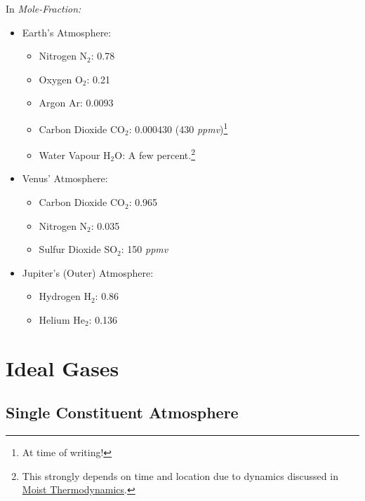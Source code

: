 In \textit{Mole-Fraction:}
\begin{multicols}{2}
\begin{itemize}
    \item Earth's Atmosphere: 
    \begin{itemize}
        \item Nitrogen N$_2$: 0.78
        \item Oxygen O$_2$: 0.21
        \item Argon Ar: 0.0093
        \item Carbon Dioxide CO$_2$: 0.000430 (430 \textit{ppmv})\footnote{At time of writing!}
        \item Water Vapour H$_2$O: A few percent.\footnote{This strongly depends on time and location due to dynamics discussed in \hyperref[Moist Thermodynamics]{Moist Thermodynamics}.}
    \end{itemize}
\end{itemize}
\end{multicols}
\begin{multicols}{2}
\begin{itemize}
    \item  Venus' Atmosphere:
    \begin{itemize}
        \item Carbon Dioxide CO$_2$: 0.965
        \item Nitrogen N$_2$: 0.035
        \item Sulfur Dioxide SO$_2$: 150 \textit{ppmv}
    \end{itemize}
    \item  Jupiter's (Outer) Atmosphere:
    \begin{itemize}
        \item Hydrogen H$_2$: 0.86
        \item Helium He$_2$: 0.136
    \end{itemize}
\end{itemize}
\end{multicols}

\section{Ideal Gases}

\subsection{Single Constituent Atmosphere}

